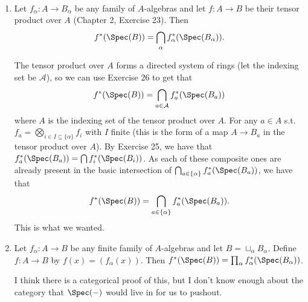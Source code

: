 \documentclass[a4paper]{exam}
\newif\ifhint
\begin{document}
\begin{questions}
\question
~
\begin{enumerate}
\item Let $f_ \alpha: A \to B_ \alpha $ be any family of $A $-algebras and let $f: A\to B $ be their tensor product over $A $ (Chapter 2, Exercise 23). Then
\[
	f^\ast(\Spec(B)) = \bigcap_{\alpha} f^\ast_{\alpha} (\Spec(B_{\alpha}))
.\] 
\ifhint
	Use Examples 25 and 26.
\fi
\begin{solution}
	The tensor product over $A $ forms a directed system of rings (let the indexing set be $\mathcal{A}$), so we can use Exercise 26 to get that
	\[
		f^\ast(\Spec(B)) = \bigcap_{a \in \mathcal{A}} f^\ast_{a}(\Spec(B_{a}))
	\] 
	where $A $ is the indexing set of the tensor product over $A $.
	For any $a\in A $ s.t. $f_a = \bigotimes_{i \in I \subseteq \{\alpha\}} f_i$ with $I $ finite (this is the form of a map $A \to B_a $ in the tensor product over $A $).
	By Exercise 25, we have that $f_a^\ast(\Spec(B_a)) = \bigcap f_i^\ast(\Spec(B_i))$.
	As each of these composite ones are already present in the basic intersection of $\bigcap_{a \in \{\alpha\} } f^\ast_a(\Spec(B_a))$, we have that
	\[
		f^\ast(\Spec(B)) = \bigcap_{a \in \{\alpha\}  } f^\ast_{a}(\Spec(B_{a}))
	.\] 
	This is what we wanted.
\end{solution}
\item Let $f_ \alpha: A\to B $ be any finite family of $A $-algebras and let $B = \sqcup_ \alpha B_ \alpha $. Define $f: A\to B $ by $f(x) = (f_ \alpha(x)) $. Then $f^\ast(\Spec(B)) = \prod_ \alpha f_ \alpha^\ast (\Spec(B_ \alpha)) $.
\begin{solution}
	I think there is a categorical proof of this, but I don't know enough about the category that $\Spec(-) $ would live in for us to pushout.


\end{solution}
\end{enumerate}
\end{questions}
\end{document}

